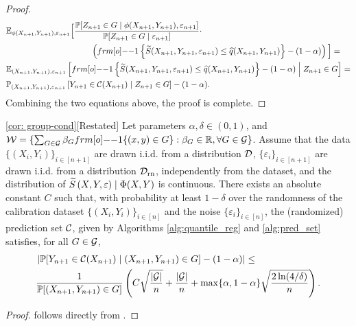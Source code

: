 \begin{proof}
\begin{align*}
     &\EE_{\phi(X_{n+1},Y_{n+1}), \varepsilon_{n+1}}\Big[ \frac{\PP[Z_{n+1} \in G \mid \phi(X_{n+1},Y_{n+1}), \varepsilon_{n+1}]}{\PP[Z_{n+1}\in G \mid \varepsilon_{n+1}]} \cdot  \\
    &\hspace{0.3\linewidth}  
    \pth{\11\sth{ \tS(X_{n+1},Y_{n+1},\varepsilon_{n+1}) \leq \hat q (X_{n+1},Y_{n+1}) }- (1-\alpha)} \Big] = \\
    &\EE_{(X_{n+1},Y_{n+1}), \varepsilon_{n+1}}\qth{  \11\sth{ \tS(X_{n+1},Y_{n+1},\varepsilon_{n+1}) \leq \hat q (X_{n+1},Y_{n+1}) }- (1-\alpha)
    \Bigm| Z_{n+1} \in G} = \\
    & \PP_{(X_{n+1},Y_{n+1}), \varepsilon_{n+1}} \qth{Y_{n+1} \in \calC(X_{n+1}) \mid Z_{n+1}\in G } - (1-\alpha).
\end{align*}
Combining the two equations above, the proof is complete.
\end{proof}
\begin{customcor}{\ref*{cor: group-cond}}[Restated]
     Let parameters $\alpha,\delta \in (0,1)$, and $\calW = \{\sum_{G \in \calG} \beta_G \11\{(x,y) \in G\}: \beta_G \in \RR, \forall G \in \calG \}$. Assume that the data $\{(X_i,Y_i)\}_{i\in [n+1]}$ are drawn \mbox{i.i.d.} from a distribution ${\cal D}$, $\{\varepsilon_i\}_{i\in [n+1]}$ are drawn \mbox{i.i.d.} from a distribution ${\cal D}_{\text{rn}}$, independently from the dataset, and the distribution of ${\widetilde{S}}\left(X,Y, \varepsilon\right) \mid \Phi(X,Y)$ is continuous. There exists an absolute constant $C$ such that, with probability at least $1-\delta$ over the randomness of the calibration dataset $\{(X_i,Y_i)\}_{i\in [n]}$ and the noise $\{\varepsilon_i\}_{i \in [n]}$, the (randomized) prediction set ${\cal C}$, given by Algorithms \ref{alg:quantile_reg} and \ref{alg:pred_set} satisfies, for all $G \in {\cal G}$,
    \begin{align*}
    &\left| \mathbb{P}[Y_{n+1}\in {\cal C}(X_{n+1}) \mid (X_{n+1},Y_{n+1})\in G] -(1-\alpha)\right| \leq \\
    &{} 
    \frac{1}{\mathbb{P}[(X_{n+1}, Y_{n+1}) \in G]}\left( C \sqrt{\frac{|{\cal G}|}{n}} + \frac{|{\cal G}|}{n} +\max \{\alpha, 1-\alpha\}\sqrt{\frac{2\ln(4/\delta)}{n}}  \right).
    \end{align*}
\end{customcor}
\begin{proof}
 follows directly from .
\end{proof}


